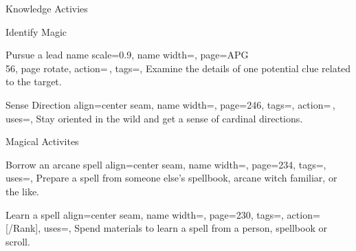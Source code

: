 \begin{PageFront}
\begin{Tables}{\frontTableHeight}
\begin{Table}{Knowledge Activies}
\begin{entry}{Identify Magic}
                \quad\;\,
            \end{entry}
            \breakLine
            \begin{entry}{Pursue a lead}{%
                name scale=0.9,
                name width=\activityLength,%
                page={APG\\\vspace{-0.4ex}56},
                page rotate,
                action=\,,
                tags=\Concentrate\Investigator,
            }
                Examine the details of one potential clue related to the target.
            \end{entry}
            \begin{entry}{Sense Direction}{%
                align=center seam,
                name width=\activityLength,%
                page=246,
                tags=\Concentrate,
                action=\,,
                uses={\Survival[tags=S]},
            }
                Stay oriented in the wild and get a sense of cardinal directions. \hfill
                \\
                \hfill{}
            \end{entry}
        \end{Table}
        \TableSpace
        \begin{Table}{Magical Activites}
            \begin{entry}{Borrow an arcane spell}{%
                align=center seam,
                name width=\activityLength,%
                page=234,
                tags=\Concentrate,
                uses={\Arcana[tags=T]},
            }
                Prepare a spell from someone else's spellbook, arcane witch familiar, or the like. \\
                 \hfill
            \end{entry}
            \begin{entry}{Learn a spell}{%
                align=center seam,
                name width=\activityLength,%
                page=230,
                tags=\Concentrate,
                action=\,[/Rank],
                uses={\MagicalSkill[tags=T]},
            }
                Spend materials to learn a spell from a person, spellbook or scroll. \hfill

\end{entry}
\end{Table}
\end{Tables}
\end{PageFront}
